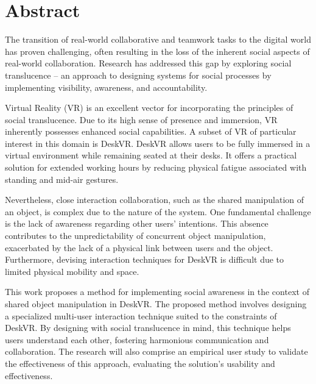 

\chapter*{Abstract}

The transition of real-world collaborative and teamwork tasks to the digital world has proven challenging, often resulting in the loss of the inherent social aspects of real-world collaboration. Research has addressed this gap by exploring social translucence -- an approach to designing systems for social processes by implementing visibility, awareness, and accountability.

Virtual Reality (VR) is an excellent vector for incorporating the principles of social translucence. Due to its high sense of presence and immersion, VR inherently possesses enhanced social capabilities. A subset of VR of particular interest in this domain is DeskVR. DeskVR allows users to be fully immersed in a virtual environment while remaining seated at their desks. It offers a practical solution for extended working hours by reducing physical fatigue associated with standing and mid-air gestures.

Nevertheless, close interaction collaboration, such as the shared manipulation of an object, is complex due to the nature of the system. One fundamental challenge is the lack of awareness regarding other users' intentions. This absence contributes to the unpredictability of concurrent object manipulation, exacerbated by the lack of a physical link between users and the object. Furthermore, devising interaction techniques for DeskVR is difficult due to limited physical mobility and space.

This work proposes a method for implementing social awareness in the context of shared object manipulation in DeskVR. The proposed method involves designing a specialized multi-user interaction technique suited to the constraints of DeskVR. By designing with social translucence in mind, this technique helps users understand each other, fostering harmonious communication and collaboration. The research will also comprise an empirical user study to validate the effectiveness of this approach, evaluating the solution's usability and effectiveness.

\vspace{1em}

